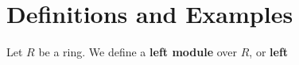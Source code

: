\section{Definitions and Examples}\label{section1}

\begin{definition}
  Let $R$ be a ring. We define a \textbf{left module} over $R$, or \textbf{left}
\end{definition}
